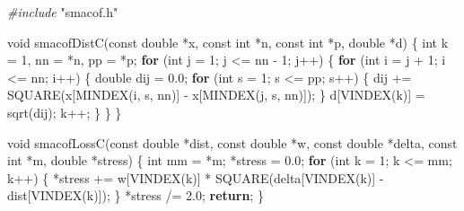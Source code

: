 \documentclass[12pt,]{article}
\newenvironment{Shaded}{\begin{snugshade}}{\end{snugshade}}
\newcommand{\DataTypeTok}[1]{\textcolor[rgb]{0.13,0.29,0.53}{#1}}
\newcommand{\DecValTok}[1]{\textcolor[rgb]{0.00,0.00,0.81}{#1}}
\newcommand{\FloatTok}[1]{\textcolor[rgb]{0.00,0.00,0.81}{#1}}
\newcommand{\ImportTok}[1]{#1}
\newcommand{\ControlFlowTok}[1]{\textcolor[rgb]{0.13,0.29,0.53}{\textbf{#1}}}
\newcommand{\PreprocessorTok}[1]{\textcolor[rgb]{0.56,0.35,0.01}{\textit{#1}}}
\newcommand{\NormalTok}[1]{#1}
\begin{document}
\begin{Shaded}
\begin{Highlighting}[]

\PreprocessorTok{#include }\ImportTok{"smacof.h"}

\DataTypeTok{void}\NormalTok{ smacofDistC(}\DataTypeTok{const} \DataTypeTok{double}\NormalTok{ *x, }\DataTypeTok{const} \DataTypeTok{int}\NormalTok{ *n, }\DataTypeTok{const} \DataTypeTok{int}\NormalTok{ *p, }\DataTypeTok{double}\NormalTok{ *d) \{}
    \DataTypeTok{int}\NormalTok{ k = }\DecValTok{1}\NormalTok{, nn = *n, pp = *p;}
    \ControlFlowTok{for}\NormalTok{ (}\DataTypeTok{int}\NormalTok{ j = }\DecValTok{1}\NormalTok{; j <= nn - }\DecValTok{1}\NormalTok{; j++) \{}
        \ControlFlowTok{for}\NormalTok{ (}\DataTypeTok{int}\NormalTok{ i = j + }\DecValTok{1}\NormalTok{; i <= nn; i++) \{}
            \DataTypeTok{double}\NormalTok{ dij = }\FloatTok{0.0}\NormalTok{;}
            \ControlFlowTok{for}\NormalTok{ (}\DataTypeTok{int}\NormalTok{ s = }\DecValTok{1}\NormalTok{; s <= pp; s++) \{}
\NormalTok{                dij += SQUARE(x[MINDEX(i, s, nn)] - x[MINDEX(j, s, nn)]);}
\NormalTok{            \}}
\NormalTok{            d[VINDEX(k)] = sqrt(dij);}
\NormalTok{            k++;}
\NormalTok{        \}}
\NormalTok{    \}}
\NormalTok{\}}

\DataTypeTok{void}\NormalTok{ smacofLossC(}\DataTypeTok{const} \DataTypeTok{double}\NormalTok{ *dist, }\DataTypeTok{const} \DataTypeTok{double}\NormalTok{ *w, }\DataTypeTok{const} \DataTypeTok{double}\NormalTok{ *delta,}
                 \DataTypeTok{const} \DataTypeTok{int}\NormalTok{ *m, }\DataTypeTok{double}\NormalTok{ *stress) \{}
    \DataTypeTok{int}\NormalTok{ mm = *m;}
\NormalTok{    *stress = }\FloatTok{0.0}\NormalTok{;}
    \ControlFlowTok{for}\NormalTok{ (}\DataTypeTok{int}\NormalTok{ k = }\DecValTok{1}\NormalTok{; k <= mm; k++) \{}
\NormalTok{        *stress += w[VINDEX(k)] * SQUARE(delta[VINDEX(k)] - dist[VINDEX(k)]);}
\NormalTok{    \}}
\NormalTok{    *stress /= }\FloatTok{2.0}\NormalTok{;}
    \ControlFlowTok{return}\NormalTok{;}
\NormalTok{\}}


\end{Highlighting}
\end{Shaded}
\end{document}
